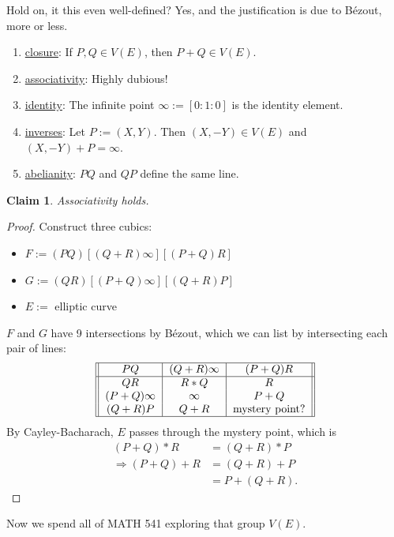 \documentclass[12pt]{article}
\newtheorem*{claim}{Claim}
\theoremstyle{definition}
\begin{document}
Hold on, it this even well-defined? Yes, and the justification is due to B\'ezout, more or less.
\begin{enumerate}
    \item \underline{closure}: If $P,Q\in V(E)$, then $P+Q\in V(E)$. \checkmark
    \item \underline{associativity}: Highly dubious!
    \item \underline{identity}: The infinite point $\infty:=[0:1:0]$ is the identity element. \checkmark
    \item \underline{inverses}: Let $P:=(X,Y)$. Then $(X,-Y)\in V(E)$ and $(X,-Y)+P=\infty$. \checkmark
    \item \underline{abelianity}: $PQ$ and $QP$ define the same line. \checkmark
\end{enumerate}
\begin{claim}
    Associativity holds.
\end{claim}
\begin{proof}
    Construct three cubics:
    \begin{itemize}
        \item $F:=(PQ)[(Q+R)\infty][(P+Q)R]$
        \item $G:=(QR)[(P+Q)\infty][(Q+R)P]$
        \item $E:=$ elliptic curve
    \end{itemize}
    $F$ and $G$ have 9 intersections by B\'ezout, which we can list by intersecting each pair of lines:
    \[
        \begin{tabular}{|| c | c | c ||}
        \hline
        $PQ$ & $(Q+R)\infty$ & $(P+Q)R$ \\
        \hline
        $QR$ & $R*Q$ & $R$ \\
        $(P+Q)\infty$ & $\infty$ & $P+Q$ \\
        $(Q+R)P$ & $Q+R$ & mystery point? \\
        \hline
        \end{tabular}
    \]
    By Cayley-Bacharach, $E$ passes through the mystery point, which is
    \begin{align*}
        (P+Q)*R&=(Q+R)*P\\
        \Rightarrow(P+Q)+R&=(Q+R)+P\\
        &=P+(Q+R).
    \end{align*}
\end{proof}
Now we spend all of MATH 541 exploring that group $V(E)$.
\end{document}
